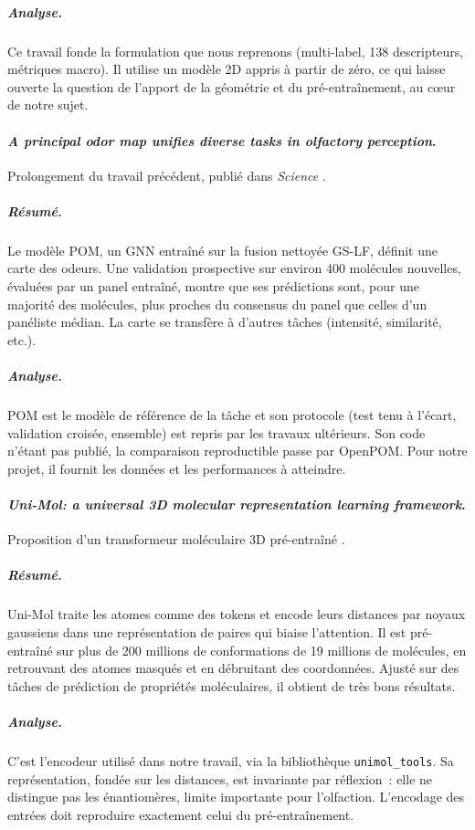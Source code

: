 \subparagraph{Analyse.}
Ce travail fonde la formulation que nous reprenons (multi-label, 138 descripteurs, métriques macro).
Il utilise un modèle 2D appris à partir de zéro, ce qui laisse ouverte la question de l'apport de la géométrie et du pré-entraînement, au cœur de notre sujet.

\paragraph{\emph{A principal odor map unifies diverse tasks in olfactory perception}.}
Prolongement du travail précédent, publié dans \emph{Science} \cite{Lee-2023}.

\subparagraph{Résumé.}
Le modèle POM, un GNN entraîné sur la fusion nettoyée GS-LF, définit une carte des odeurs.
Une validation prospective sur environ 400 molécules nouvelles, évaluées par un panel entraîné, montre que ses prédictions sont, pour une majorité des molécules, plus proches du consensus du panel que celles d'un panéliste médian.
La carte se transfère à d'autres tâches (intensité, similarité, etc.).

\subparagraph{Analyse.}
POM est le modèle de référence de la tâche et son protocole (test tenu à l'écart, validation croisée, ensemble) est repris par les travaux ultérieurs.
Son code n'étant pas publié, la comparaison reproductible passe par OpenPOM.
Pour notre projet, il fournit les données et les performances à atteindre.

\paragraph{\emph{Uni-Mol: a universal 3D molecular representation learning framework}.}
Proposition d'un transformeur moléculaire 3D pré-entraîné \cite{Zhou-2023}.

\subparagraph{Résumé.}
Uni-Mol traite les atomes comme des tokens et encode leurs distances par noyaux gaussiens dans une représentation de paires qui biaise l'attention.
Il est pré-entraîné sur plus de 200 millions de conformations de 19 millions de molécules, en retrouvant des atomes masqués et en débruitant des coordonnées.
Ajusté sur des tâches de prédiction de propriétés moléculaires, il obtient de très bons résultats.

\subparagraph{Analyse.}
C'est l'encodeur utilisé dans notre travail, via la bibliothèque \texttt{unimol\_tools}.
Sa représentation, fondée sur les distances, est invariante par réflexion~: elle ne distingue pas les énantiomères, limite importante pour l'olfaction.
L'encodage des entrées doit reproduire exactement celui du pré-entraînement.

